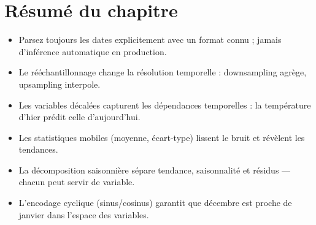 \section{R\'esum\'e du chapitre}

\begin{itemize}
  \item Parsez toujours les dates explicitement avec un format connu ; jamais d'inf\'erence automatique en production.
  \item Le r\'e\'echantillonnage change la r\'esolution temporelle : downsampling agr\`ege, upsampling interpole.
  \item Les variables d\'ecal\'ees capturent les d\'ependances temporelles : la temp\'erature d'hier pr\'edit celle d'aujourd'hui.
  \item Les statistiques mobiles (moyenne, \'ecart-type) lissent le bruit et r\'ev\`elent les tendances.
  \item La d\'ecomposition saisonni\`ere s\'epare tendance, saisonnalit\'e et r\'esidus --- chacun peut servir de variable.
  \item L'encodage cyclique (sinus/cosinus) garantit que d\'ecembre est proche de janvier dans l'espace des variables.
\end{itemize}
